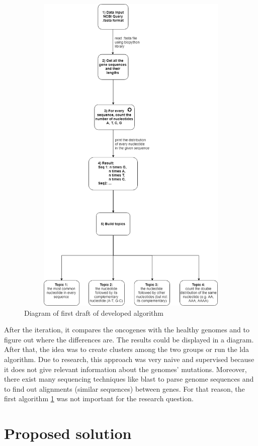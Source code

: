 \begin{figure}[htbp]
	\centering
	\includegraphics[width=1\textwidth, height=600px, keepaspectratio]{Image/creating_topics_algorithm.png}
	\caption{Diagram of first draft of developed algorithm}
	\label{first_draft_figure}
\end{figure}

After the iteration, it compares the oncogenes with the healthy genomes and to figure out where the differences are. The results could be displayed in a diagram. After that, the idea was to create clusters among the two groups or run the \ac{lda} algorithm.
Due to research, this approach was very naive and supervised because it does not give relevant information about the genomes' mutations. Moreover, there exist many sequencing techniques like \ac{blast} to parse genome sequences and to find out alignments (similar sequences) between genes.
For that reason, the first algorithm \ref{first_draft_figure} was not important for the research question.

\section{Proposed solution}\label{proposed_solution}

